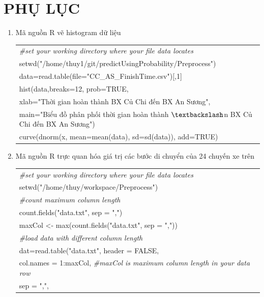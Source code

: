 \documentclass[a4paper, 13pt]{report}
\begin{document}
\chapter{PHỤ LỤC}
\begin{enumerate}[label=\textbf{PL\arabic*}]
\item \label{histogramWithNormalCurve} Mã nguồn R vẽ histogram dữ liệu
\begin{flushleft}
\begin{tabular}{  |l| }
\hline 
\textit{\#set your working directory where your file data locates}\\
setwd("/home/thuy1/git/predictUsingProbability/Preprocess")\\
data=read.table(file="CC\_AS\_FinishTime.csv")[,1]\\
hist(data,breaks=12, prob=TRUE,\\
\hspace{1cm} xlab="Thời gian hoàn thành BX Củ Chi đến BX An Sương",\\
\hspace{1cm} main="Biểu đồ phân phối thời gian hoàn thành $\textbackslash$n BX Củ Chi đến BX An Sương")\\
curve(dnorm(x, mean=mean(data), sd=sd(data)), add=TRUE)\\
\hline
\end{tabular}
\end{flushleft}
\item  \label{trucquandichuyen} Mã nguồn R trực quan hóa giá trị các bước di chuyển của 24 chuyến xe trên\\
\begin{flushleft}
\begin{tabular}{ |l| }
\hline 
\textit{\#set your working directory where your file data locates}\\
setwd("/home/thuy/workspace/Preprocess")\\
\textit{\#count maximum column length}\\
count.fields("data.txt", sep = ",")\\
maxCol <- max(count.fields("data.txt", sep = ","))\\
\textit{\#load data with different column length}\\
dat=read.table("data.txt", header = FALSE, \\
\hspace{2cm} col.names = 1:maxCol, \textit{\#maxCol is maximum column length in your data row}\\ 				
\hspace{2cm} sep = ",",\\ 

\end{tabular}
\end{flushleft}
\end{enumerate}
\end{document}
